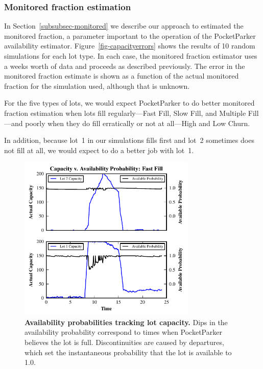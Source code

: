 \subsubsection{Monitored fraction estimation}

In Section~\ref{subsubsec-monitored} we describe our approach to estimated
the monitored fraction, a parameter important to the operation of the
PocketParker availability estimator. Figure~\ref{fig-capacityerrors} shows
the results of 10 random simulations for each lot type. In each case, the
monitored fraction estimator uses a weeks worth of data and proceeds as
described previously. The error in the monitored fraction estimate is shown
as a function of the actual monitored fraction for the simulation used,
although that is unknown.

For the five types of lots, we would expect PocketParker to do better
monitored fraction estimation when lots fill regularly---Fast Fill, Slow
Fill, and Multiple Fill---and poorly when they do fill erratically or not at
all---High and Low Churn. 

In addition, because lot~1 in our simulations fills
first and lot~2 sometimes does not fill at all, we would expect to do a
better job with lot~1. 

\begin{figure}
\centering
\includegraphics[width=3.325in]{./simulator/figures/tracking_fastfill.pdf}

\caption{\textbf{Availability probabilities tracking lot capacity.} Dips in
the availability probability correspond to times when PocketParker believes
the lot is full. Discontinuities are caused by departures, which set the
instantaneous probability that the lot is available to 1.0.}

\label{fig-trackingexample}
\end{figure}

